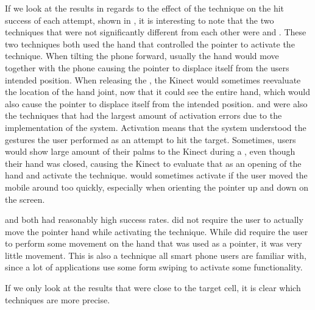 If we look at the results in regards to the effect of the technique on the hit success of each attempt, shown in , it is interesting to note that the two techniques that were not significantly different from each other were \tilt and \pinch. These two techniques both used the hand that controlled the pointer to activate the technique. When tilting the phone forward, usually the hand would move together with the phone causing the pointer to displace itself from the users intended position. When releasing the \pinch, the Kinect would sometimes reevaluate the location of the hand joint, now that it could see the entire hand, which would also cause the pointer to displace itself from the intended position. \pinch and \tilt were also the techniques that had the largest amount of activation errors due to the implementation of the system.
Activation means that the system understood the gestures the user performed as an attempt to hit the target.
Sometimes, users would show large amount of their palms to the Kinect during a \pinch, even though their hand was closed, causing the Kinect to evaluate that as an opening of the hand and activate the technique. \tilt would sometimes activate if the user moved the mobile around too quickly, especially when orienting the pointer up and down on the screen.  

\swipe and \throw both had reasonably high success rates. \throw did not require the user to actually move the pointer hand while activating the technique. While \swipe did require the user to perform some movement on the hand that was used as a pointer, it was very little movement. This is also a technique all smart phone users are familiar with, since a lot of applications use some form swiping to activate some functionality.

If we only look at the results that were close to the target cell, it is clear which techniques are more precise. 

